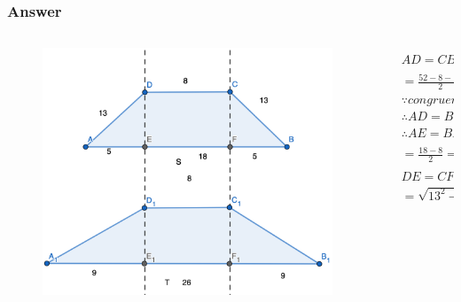 \documentclass[
	11pt, %
]{beamer}
\begin{document}


\begin{frame}
	\frametitle{Answer}
	\begin{columns}[t] 

		\begin{column}{0.5\textwidth} %
		  \pause
			\begin{figure}
				\includegraphics[width=\linewidth]{Trapezoid_Question1_1.png}
			\end{figure}
		\end{column}

		\begin{column}{0.5\textwidth} %
			\begin{equation*}
				\begin{aligned}
					&AD= CB = \frac{perimeter_S - DC - AB}{2}\\
					&=\frac{52 - 8 - 18}{2}=13\\
					&\because congruent\ nonparallel\ sides\\
					&\therefore  AD  = BC\\
					&\therefore AE  = BF = \frac{AB - CD}{2}\\
					&=\frac{18 - 8}{2}=5\\
					&DE=CF = \sqrt{AD^2 - AE^2} \\
					&=\sqrt{13^2 - 5^2} =12\\
				\end{aligned}
			\end{equation*}	
		\end{column}

	\end{columns}
\end{frame}
\end{document}

